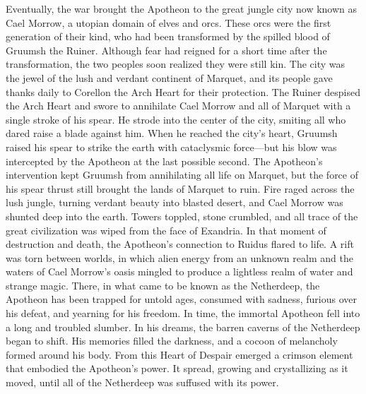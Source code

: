 \documentclass[10pt,a4paper,twoside,bg=print,twocolumn,openany,nodeprecatedcode]{dndbook}
\begin{document}
Eventually, the war brought the Apotheon to the great jungle city now known as Cael Morrow, a utopian domain of elves and orcs. These orcs were the first generation of their kind, who had been transformed by the spilled blood of Gruumsh the Ruiner. Although fear had reigned for a short time after the transformation, the two peoples soon realized they were still kin. The city was the jewel of the lush and verdant continent of Marquet, and its people gave thanks daily to Corellon the Arch Heart for their protection.
The Ruiner despised the Arch Heart and swore to annihilate Cael Morrow and all of Marquet with a single stroke of his spear. He strode into the center of the city, smiting all who dared raise a blade against him. When he reached the city's heart, Gruumsh raised his spear to strike the earth with cataclysmic force—but his blow was intercepted by the Apotheon at the last possible second.
The Apotheon's intervention kept Gruumsh from annihilating all life on Marquet, but the force of his spear thrust still brought the lands of Marquet to ruin. Fire raged across the lush jungle, turning verdant beauty into blasted desert, and Cael Morrow was shunted deep into the earth. Towers toppled, stone crumbled, and all trace of the great civilization was wiped from the face of Exandria.
In that moment of destruction and death, the Apotheon's connection to Ruidus flared to life. A rift was torn between worlds, in which alien energy from an unknown realm and the waters of Cael Morrow's oasis mingled to produce a lightless realm of water and strange magic. There, in what came to be known as the Netherdeep, the Apotheon has been trapped for untold ages, consumed with sadness, furious over his defeat, and yearning for his freedom.
In time, the immortal Apotheon fell into a long and troubled slumber. In his dreams, the barren caverns of the Netherdeep began to shift. His memories filled the darkness, and a cocoon of melancholy formed around his body. From this Heart of Despair emerged a crimson element that embodied the Apotheon's power. It spread, growing and crystallizing as it moved, until all of the Netherdeep was suffused with its power.
\end{document}
